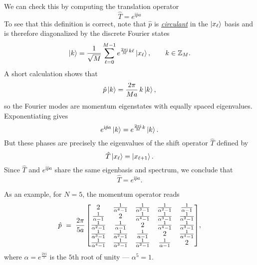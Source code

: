 \documentclass[10pt, a4paper]{article}
\newcommand{\ii}{\mathrm{i}}
\numberwithin{equation}{section}
\begin{document}
We can check this by computing the translation operator
\begin{equation}
  \hat{T} = e^{\ii \hat{p} a}
\end{equation}
To see that this definition is correct, note that $\hat{p}$ is \href{https://en.wikipedia.org/wiki/Circulant_matrix}{{\color{blue} \textit{circulant}}} in the $\ket{x_\ell}$ basis and is therefore diagonalized by the discrete Fourier states
\begin{equation}
  \ket{k} = \frac{1}{\sqrt{M}} \sum_{\ell=0}^{M-1} 
  e^{\frac{2\pi \ii}{M} k \ell} \ket{x_\ell}, 
  \qquad k \in \mathbb{Z}_M .
\end{equation}
A short calculation shows that
\begin{equation}
  \hat{p} \ket{k} = \frac{2\pi}{M a}\, k \ket{k},
\end{equation}
so the Fourier modes are momentum eigenstates with equally spaced eigenvalues.  
Exponentiating gives
\begin{equation}
  e^{\ii \hat{p} a} \ket{k} = e^{\frac{2\pi \ii}{M} k} \ket{k}.
\end{equation}
But these phases are precisely the eigenvalues of the shift operator $\hat{T}$ defined by
\begin{equation}
  \hat{T}\ket{x_\ell} = \ket{x_{\ell+1}}.
\end{equation}
Since $\hat{T}$ and $e^{\ii \hat{p} a}$ share the same eigenbasis and spectrum, we conclude that
\begin{equation}
  \hat{T} = e^{\ii \hat{p} a}.
\end{equation}

As an example, for $N = 5$, the momentum operator reads
\begin{equation}
  \hat{p} \ = \ \frac{2 \pi}{5 a} \, \mqty[
 2 & \frac{1}{\alpha ^4-1} & \frac{1}{\alpha ^3-1} & \frac{1}{\alpha ^2-1} & \frac{1}{\alpha -1} \\
 \frac{1}{\alpha -1} & 2 & \frac{1}{\alpha ^4-1} & \frac{1}{\alpha ^3-1} & \frac{1}{\alpha ^2-1} \\
 \frac{1}{\alpha ^2-1} & \frac{1}{\alpha -1} & 2 & \frac{1}{\alpha ^4-1} & \frac{1}{\alpha ^3-1} \\
 \frac{1}{\alpha ^3-1} & \frac{1}{\alpha ^2-1} & \frac{1}{\alpha -1} & 2 & \frac{1}{\alpha ^4-1} \\
 \frac{1}{\alpha ^4-1} & \frac{1}{\alpha ^3-1} & \frac{1}{\alpha ^2-1} & \frac{1}{\alpha -1} & 2],
\end{equation}
where $\alpha = e^{\frac{2\pi \ii}{5}}$ is the $5$th root of unity --- $\alpha^5 = 1$.



\printbibliography
\end{document}
